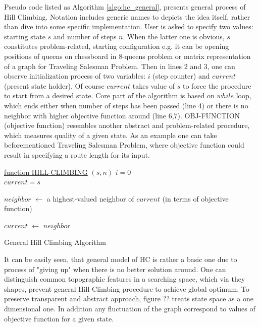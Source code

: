 \documentclass{mini}
\begin{document}
Pseudo code listed as Algorithm \ref{algo:hc_general}, presents general process of Hill Climbing. Notation includes generic names to depicts the idea itself, rather than dive into some specific implementation. User is asked to specify two values: starting state $s$ and number of steps $n$. When the latter one is obvious, $s$ constitutes problem-related, starting configuration e.g. it can be opening positions of queens on chessboard in 8-queens problem or matrix representation of a graph for Traveling Salesman Problem. Then in lines 2 and 3, one can observe initialization process of two variables: $i$ (step counter) and $current$ (present state holder). Of course $current$ takes value of $s$ to force the procedure to start from a desired state. Core part of the algorithm is based on $while$ loop, which ends either when number of steps has been passed (line 4) or there is no neighbor with higher objective function around (line 6,7). \textsc{OBJ-FUNCTION} (objective function) resembles another abstract and problem-related procedure, which measures quality of a given state. As an example one can take beforementioned Traveling Salesman Problem, where objective function could result in specifying a route length for its input. 

\begin{algorithm}[H]
    \underline{function HILL-CLIMBING} $(s, n)$\;
    $i = 0$ \\
    $current = s$ \\
    {
        $neighbor$ $\gets$ a highest-valued neighbor of $current$ (in terms of objective function) \\
        
        {
        }
        
        $current$ $\gets$ $neighbor$
    }
    \caption{General Hill Climbing Algorithm}
    \label{algo:hc_general}
\end{algorithm}

It can be easily seen, that general model of HC is rather a basic one due to process of "giving up" when there is no better solution around. One can distinguish common topographic features in a searching space, which via they shapes, prevent general Hill Climbing procedure to achieve global optimum. To preserve transparent and abstract approach, figure ?? treats state space as a one dimensional one. In addition any fluctuation of the graph correspond to values of objective function for a given state.
\end{document}
